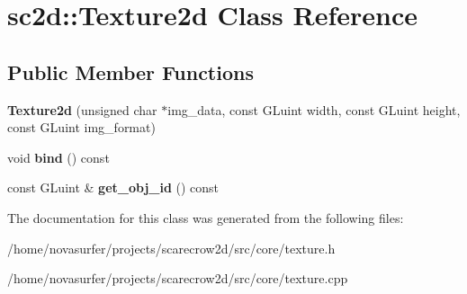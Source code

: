\hypertarget{classsc2d_1_1Texture2d}{}\section{sc2d\+:\+:Texture2d Class Reference}
\label{classsc2d_1_1Texture2d}
\subsection*{Public Member Functions}
\begin{DoxyCompactItemize}
\item 
\mbox{\label{classsc2d_1_1Texture2d_a77d5a2fb4eefdce514844127680f2688}} 
{\bfseries Texture2d} (unsigned char $\ast$img\+\_\+data, const G\+Luint width, const G\+Luint height, const G\+Luint img\+\_\+format)
\item 
\mbox{\label{classsc2d_1_1Texture2d_a93f00eee473909d927427e5329410175}} 
void {\bfseries bind} () const
\item 
\mbox{\label{classsc2d_1_1Texture2d_a4e47938f401846701f048fcf93cde4c5}} 
const G\+Luint \& {\bfseries get\+\_\+obj\+\_\+id} () const
\end{DoxyCompactItemize}


The documentation for this class was generated from the following files\+:\begin{DoxyCompactItemize}
\item 
/home/novasurfer/projects/scarecrow2d/src/core/texture.\+h\item 
/home/novasurfer/projects/scarecrow2d/src/core/texture.\+cpp\end{DoxyCompactItemize}
